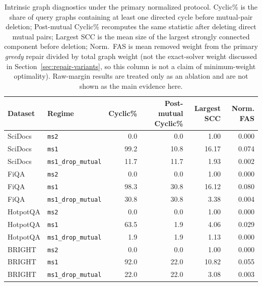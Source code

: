 \documentclass[manuscript,anonymous,review]{acmart}
\begin{document}
\begin{table}[t]
  \caption{Intrinsic graph diagnostics under the primary normalized protocol.
    Cyclic\% is the share of query graphs containing at least one directed
    cycle before mutual-pair deletion; Post-mutual Cyclic\% recomputes the same
    statistic after deleting direct mutual pairs; Largest SCC is the mean size
    of the largest strongly connected component before deletion; Norm.\ FAS is
    mean removed weight from the primary \emph{greedy} repair divided by total
    graph weight (not the exact-solver weight discussed in
    Section~\ref{sec:repair-variants}, so this column is not a claim of
    minimum-weight optimality). Raw-margin results are treated only as an
    ablation and are not shown as the main evidence here.}
  \label{tab:structural-results}
  \scriptsize
  \begin{tabular}{llrrrr}
    \toprule
    Dataset & Regime & Cyclic\% & Post-mutual Cyclic\% & Largest SCC & Norm. FAS \\
    \midrule
    SciDocs  & \texttt{ms2}               & 0.0  & 0.0  & 1.00  & 0.000 \\
    SciDocs  & \texttt{ms1}               & 99.2 & 10.8 & 16.17 & 0.074 \\
    SciDocs  & \texttt{ms1\_drop\_mutual} & 11.7 & 11.7 & 1.93  & 0.002 \\
    FiQA     & \texttt{ms2}               & 0.0  & 0.0  & 1.00  & 0.000 \\
    FiQA     & \texttt{ms1}               & 98.3 & 30.8 & 16.12 & 0.080 \\
    FiQA     & \texttt{ms1\_drop\_mutual} & 30.8 & 30.8 & 3.38  & 0.004 \\
    HotpotQA & \texttt{ms2}               & 0.0  & 0.0  & 1.00  & 0.000 \\
    HotpotQA & \texttt{ms1}               & 63.5 & 1.9  & 4.06  & 0.029 \\
    HotpotQA & \texttt{ms1\_drop\_mutual} & 1.9  & 1.9  & 1.13  & 0.000 \\
    BRIGHT   & \texttt{ms2}               & 0.0  & 0.0  & 1.00  & 0.000 \\
    BRIGHT   & \texttt{ms1}               & 92.0 & 22.0 & 10.82 & 0.055 \\
    BRIGHT   & \texttt{ms1\_drop\_mutual} & 22.0 & 22.0 & 3.08  & 0.003 \\
    \bottomrule
  \end{tabular}
\end{table}
\end{document}
